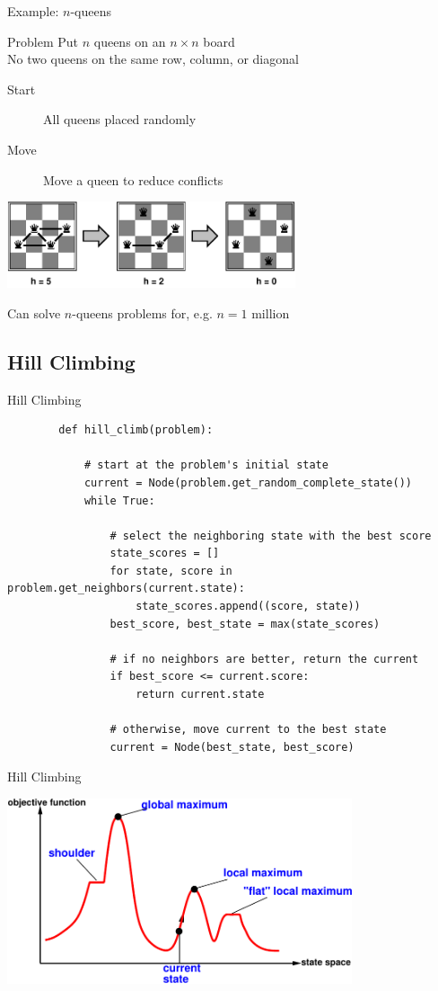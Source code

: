 \documentclass[14pt]{beamer}
\begin{document}
\begin{frame}{Example: $n$-queens}
	\begin{block}{Problem}
		Put $n$ queens on an $n \times n$ board \\
		No two queens	on the same row, column, or diagonal
	\end{block}
	\begin{description}
		\item[Start] All queens placed randomly
		\item[Move] Move a queen to reduce conflicts
	\end{description}
	\begin{center}
		\includegraphics[height=1in]{4-queens-iterative.pdf}
	\end{center}
	Can solve $n$-queens problems for, e.g. $n = 1$ million
\end{frame}

\subsection{Hill Climbing}
\begin{frame}[fragile]{Hill Climbing}
	\scriptsize
	\begin{lstlisting}
		def hill_climb(problem):
		
		    # start at the problem's initial state
		    current = Node(problem.get_random_complete_state())
		    while True:
		
		        # select the neighboring state with the best score
		        state_scores = []
		        for state, score in problem.get_neighbors(current.state):
		            state_scores.append((score, state))
		        best_score, best_state = max(state_scores)
		
		        # if no neighbors are better, return the current
		        if best_score <= current.score:
		            return current.state
		
		        # otherwise, move current to the best state
		        current = Node(best_state, best_score)
	\end{lstlisting}
\end{frame}
\begin{frame}{Hill Climbing}
	\begin{center}
		\includegraphics[width=4in]{hill-climbing.pdf}
	\end{center}
\end{frame}
\end{document}
